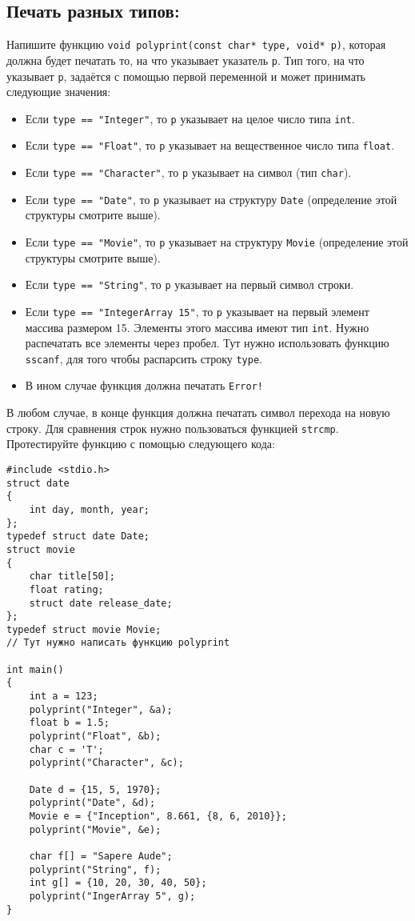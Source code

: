 \documentclass{article}
\begin{document}
\subsection{Печать разных типов:}
Напишите функцию \texttt{void polyprint(const char* type, void* p)}, которая должна будет печатать то, на что указывает указатель \texttt{p}. Тип того, на что указывает \texttt{p}, задаётся с помощью первой переменной и может принимать следующие значения:
\begin{itemize}
\item Если \texttt{type == "Integer"}, то \texttt{p} указывает на целое число типа \texttt{int}.
\item Если \texttt{type == "Float"}, то \texttt{p} указывает на вещественное число типа \texttt{float}.
\item Если \texttt{type == "Character"}, то \texttt{p} указывает на символ (тип \texttt{char}).
\item Если \texttt{type == "Date"}, то \texttt{p} указывает на структуру \texttt{Date} (определение этой структуры смотрите выше).
\item Если \texttt{type == "Movie"}, то \texttt{p} указывает на структуру \texttt{Movie} (определение этой структуры смотрите выше).
\item Если \texttt{type == "String"}, то \texttt{p} указывает на первый символ строки.
\item Если \texttt{type == "IntegerArray 15"}, то \texttt{p} указывает на первый элемент массива размером 15. Элементы этого массива имеют тип \texttt{int}. Нужно распечатать все элементы через пробел. Тут нужно использовать функцию \texttt{sscanf}, для того чтобы распарсить строку \texttt{type}.
\item В ином случае функция должна печатать \texttt{Error!}
\end{itemize}
В любом случае, в конце функция должна печатать символ перехода на новую строку. Для сравнения строк нужно пользоваться функцией \texttt{strcmp}. Протестируйте функцию с помощью следующего кода:

\begin{lstlisting}
#include <stdio.h>
struct date 
{
    int day, month, year;
};
typedef struct date Date;
struct movie 
{
    char title[50];
    float rating;
    struct date release_date;
};
typedef struct movie Movie;
// Тут нужно написать функцию polyprint

int main() 
{
    int a = 123;
    polyprint("Integer", &a);
    float b = 1.5;
    polyprint("Float", &b);
    char c = 'T';
    polyprint("Character", &c);
    
    Date d = {15, 5, 1970};
    polyprint("Date", &d);
    Movie e = {"Inception", 8.661, {8, 6, 2010}};
    polyprint("Movie", &e);
    
    char f[] = "Sapere Aude";
    polyprint("String", f);
    int g[] = {10, 20, 30, 40, 50};
    polyprint("IngerArray 5", g);
}
\end{lstlisting}
\end{document}
